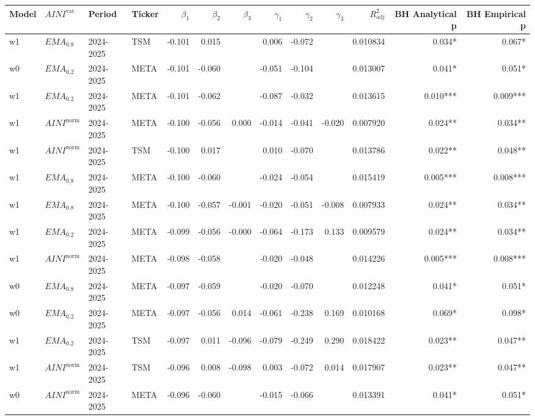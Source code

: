 \setlength\tabcolsep{2.0pt}
\scriptsize

\begin{tabular}{@{}llllrrrrrrrrr@{}}
\toprule
Model & $AINI^{\mathrm{var}}$ & Period & Ticker & $\beta_{1}$ & $\beta_{2}$ & $\beta_{3}$ & $\gamma_{1}$ & $\gamma_{2}$ & $\gamma_{3}$ & $R^{2}_{\mathrm{adj}}$ & BH Analytical p & BH Empirical p \\
\midrule
w1 & $EMA_{0.8}$ & 2024-2025 & TSM & -0.101 & 0.015 &  & 0.006 & -0.072 &  & 0.010834 & 0.034* & 0.067* \\
w0 & $EMA_{0.2}$ & 2024-2025 & META & -0.101 & -0.060 &  & -0.051 & -0.104 &  & 0.013007 & 0.041* & 0.051* \\
w1 & $EMA_{0.2}$ & 2024-2025 & META & -0.101 & -0.062 &  & -0.087 & -0.032 &  & 0.013615 & 0.010*** & 0.009*** \\
w1 & $AINI^{\mathrm{norm}}$ & 2024-2025 & META & -0.100 & -0.056 & 0.000 & -0.014 & -0.041 & -0.020 & 0.007920 & 0.024** & 0.034** \\
w1 & $AINI^{\mathrm{norm}}$ & 2024-2025 & TSM & -0.100 & 0.017 &  & 0.010 & -0.070 &  & 0.013786 & 0.022** & 0.048** \\
w1 & $EMA_{0.8}$ & 2024-2025 & META & -0.100 & -0.060 &  & -0.024 & -0.054 &  & 0.015419 & 0.005*** & 0.008*** \\
w1 & $EMA_{0.8}$ & 2024-2025 & META & -0.100 & -0.057 & -0.001 & -0.020 & -0.051 & -0.008 & 0.007933 & 0.024** & 0.034** \\
w1 & $EMA_{0.2}$ & 2024-2025 & META & -0.099 & -0.056 & -0.000 & -0.064 & -0.173 & 0.133 & 0.009579 & 0.024** & 0.034** \\
w1 & $AINI^{\mathrm{norm}}$ & 2024-2025 & META & -0.098 & -0.058 &  & -0.020 & -0.048 &  & 0.014226 & 0.005*** & 0.008*** \\
w0 & $EMA_{0.8}$ & 2024-2025 & META & -0.097 & -0.059 &  & -0.020 & -0.070 &  & 0.012248 & 0.041* & 0.051* \\
w0 & $EMA_{0.2}$ & 2024-2025 & META & -0.097 & -0.056 & 0.014 & -0.061 & -0.238 & 0.169 & 0.010168 & 0.069* & 0.098* \\
w1 & $EMA_{0.2}$ & 2024-2025 & TSM & -0.097 & 0.011 & -0.096 & -0.079 & -0.249 & 0.290 & 0.018422 & 0.023** & 0.047** \\
w1 & $AINI^{\mathrm{norm}}$ & 2024-2025 & TSM & -0.096 & 0.008 & -0.098 & 0.003 & -0.072 & 0.014 & 0.017907 & 0.023** & 0.047** \\
w0 & $AINI^{\mathrm{norm}}$ & 2024-2025 & META & -0.096 & -0.060 &  & -0.015 & -0.066 &  & 0.013391 & 0.041* & 0.051* \\

\end{tabular}
